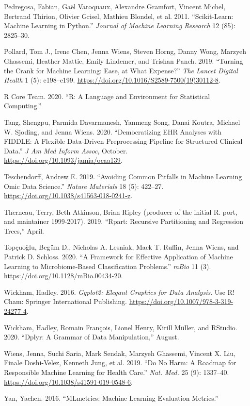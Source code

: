 \documentclass[
]{article}
\begin{document}
\leavevmode\hypertarget{ref-pedregosa_scikit-learn_2011}{}%
Pedregosa, Fabian, Gaël Varoquaux, Alexandre Gramfort, Vincent Michel,
Bertrand Thirion, Olivier Grisel, Mathieu Blondel, et al. 2011.
``Scikit-Learn: Machine Learning in Python.'' \emph{Journal of Machine
Learning Research} 12 (85): 2825--30.

\leavevmode\hypertarget{ref-pollard_turning_2019}{}%
Pollard, Tom J., Irene Chen, Jenna Wiens, Steven Horng, Danny Wong,
Marzyeh Ghassemi, Heather Mattie, Emily Lindemer, and Trishan Panch.
2019. ``Turning the Crank for Machine Learning: Ease, at What Expense?''
\emph{The Lancet Digital Health} 1 (5): e198--e199.
\url{https://doi.org/10.1016/S2589-7500(19)30112-8}.

\leavevmode\hypertarget{ref-r_core_team_r_2020}{}%
R Core Team. 2020. ``R: A Language and Environment for Statistical
Computing.''

\leavevmode\hypertarget{ref-tang_democratizing_2020}{}%
Tang, Shengpu, Parmida Davarmanesh, Yanmeng Song, Danai Koutra, Michael
W. Sjoding, and Jenna Wiens. 2020. ``Democratizing EHR Analyses with
FIDDLE: A Flexible Data-Driven Preprocessing Pipeline for Structured
Clinical Data.'' \emph{J Am Med Inform Assoc}, October.
\url{https://doi.org/10.1093/jamia/ocaa139}.

\leavevmode\hypertarget{ref-teschendorff_avoiding_2019}{}%
Teschendorff, Andrew E. 2019. ``Avoiding Common Pitfalls in Machine
Learning Omic Data Science.'' \emph{Nature Materials} 18 (5): 422--27.
\url{https://doi.org/10.1038/s41563-018-0241-z}.

\leavevmode\hypertarget{ref-therneau_rpart_2019}{}%
Therneau, Terry, Beth Atkinson, Brian Ripley (producer of the initial R.
port, and maintainer 1999-2017). 2019. ``Rpart: Recursive Partitioning
and Regression Trees,'' April.

\leavevmode\hypertarget{ref-topcuoglu_framework_2020}{}%
Topçuoğlu, Begüm D., Nicholas A. Lesniak, Mack T. Ruffin, Jenna Wiens,
and Patrick D. Schloss. 2020. ``A Framework for Effective Application of
Machine Learning to Microbiome-Based Classification Problems.''
\emph{mBio} 11 (3). \url{https://doi.org/10.1128/mBio.00434-20}.

\leavevmode\hypertarget{ref-wickham_ggplot2_2016}{}%
Wickham, Hadley. 2016. \emph{Ggplot2: Elegant Graphics for Data
Analysis}. Use R! Cham: Springer International Publishing.
\url{https://doi.org/10.1007/978-3-319-24277-4}.

\leavevmode\hypertarget{ref-wickham_dplyr_2020}{}%
Wickham, Hadley, Romain François, Lionel Henry, Kirill Müller, and
RStudio. 2020. ``Dplyr: A Grammar of Data Manipulation,'' August.

\leavevmode\hypertarget{ref-wiens_no_2019}{}%
Wiens, Jenna, Suchi Saria, Mark Sendak, Marzyeh Ghassemi, Vincent X.
Liu, Finale Doshi-Velez, Kenneth Jung, et al. 2019. ``Do No Harm: A
Roadmap for Responsible Machine Learning for Health Care.'' \emph{Nat.
Med.} 25 (9): 1337--40. \url{https://doi.org/10.1038/s41591-019-0548-6}.

\leavevmode\hypertarget{ref-yan_mlmetrics_2016}{}%
Yan, Yachen. 2016. ``MLmetrics: Machine Learning Evaluation Metrics.''
\end{document}
